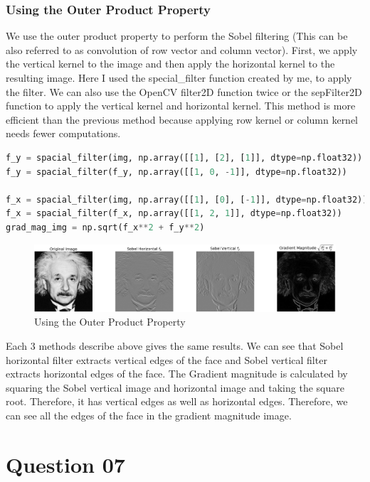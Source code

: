 \documentclass[a4paper]{article}
\begin{document}
\subsubsection*{Using the Outer Product Property}
We use the outer product property to perform the Sobel filtering
 (This can be also referred to as convolution of row vector and
  column vector). First, we apply the vertical kernel to the
   image and then apply the horizontal kernel to the resulting
    image. Here I used the special\_filter function created
     by me, to apply the filter. We can also use the OpenCV
      filter2D function twice or the sepFilter2D function to
       apply the vertical kernel and horizontal kernel. This
        method is more efficient than the previous method
         because applying row kernel or column kernel needs 
         fewer computations.
\begin{lstlisting}[language=python]
f_y = spacial_filter(img, np.array([[1], [2], [1]], dtype=np.float32))
f_y = spacial_filter(f_y, np.array([[1, 0, -1]], dtype=np.float32))

f_x = spacial_filter(img, np.array([[1], [0], [-1]], dtype=np.float32))
f_x = spacial_filter(f_x, np.array([[1, 2, 1]], dtype=np.float32))
grad_mag_img = np.sqrt(f_x**2 + f_y**2)
\end{lstlisting}
\begin{figure}[!htb]
    \centering
    \includegraphics[width=\textwidth]{../q63.png}
    \caption{Using the Outer Product Property}
    \label{figq63}
\end{figure}
Each 3 methods describe above gives the same results. We
 can see that Sobel horizontal filter extracts vertical edges
  of the face and Sobel vertical filter extracts horizontal
   edges of the face. The Gradient magnitude is calculated by
    squaring the Sobel vertical image and horizontal image and
     taking the square root. Therefore, it has vertical edges as
      well as horizontal edges. Therefore, we can see all the
       edges of the face in the gradient magnitude image.

\section*{Question 07}
\end{document}
